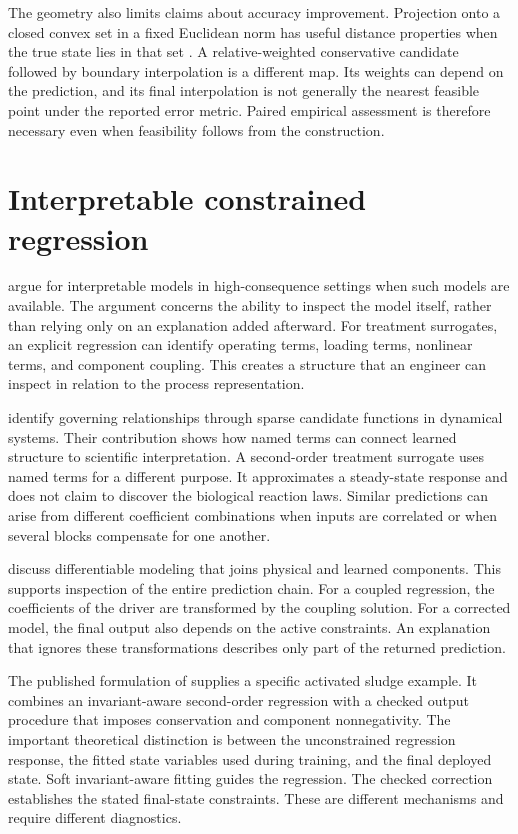 The geometry also limits claims about accuracy improvement. Projection onto a closed convex set in a fixed Euclidean norm has useful distance properties when the true state lies in that set \citep{Boyd2004}. A relative-weighted conservative candidate followed by boundary interpolation is a different map. Its weights can depend on the prediction, and its final interpolation is not generally the nearest feasible point under the reported error metric. Paired empirical assessment is therefore necessary even when feasibility follows from the construction.

\section{Interpretable constrained regression}

\citet{Rudin2019} argue for interpretable models in high-consequence settings when such models are available. The argument concerns the ability to inspect the model itself, rather than relying only on an explanation added afterward. For treatment surrogates, an explicit regression can identify operating terms, loading terms, nonlinear terms, and component coupling. This creates a structure that an engineer can inspect in relation to the process representation.

\citet{Brunton2016} identify governing relationships through sparse candidate functions in dynamical systems. Their contribution shows how named terms can connect learned structure to scientific interpretation. A second-order treatment surrogate uses named terms for a different purpose. It approximates a steady-state response and does not claim to discover the biological reaction laws. Similar predictions can arise from different coefficient combinations when inputs are correlated or when several blocks compensate for one another.

\citet{Shen2023} discuss differentiable modeling that joins physical and learned components. This supports inspection of the entire prediction chain. For a coupled regression, the coefficients of the driver are transformed by the coupling solution. For a corrected model, the final output also depends on the active constraints. An explanation that ignores these transformations describes only part of the returned prediction.

The published formulation of \citet{Selerio2026} supplies a specific activated sludge example. It combines an invariant-aware second-order regression with a checked output procedure that imposes conservation and component nonnegativity. The important theoretical distinction is between the unconstrained regression response, the fitted state variables used during training, and the final deployed state. Soft invariant-aware fitting guides the regression. The checked correction establishes the stated final-state constraints. These are different mechanisms and require different diagnostics.

